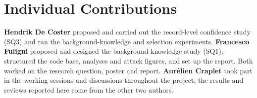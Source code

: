 \section*{Individual Contributions}

\textbf{Hendrik De Coster} proposed and carried out the record-level confidence study (SQ3) and ran the background-knowledge and selection experiments. \textbf{Francesco Fuligni} proposed and designed the background-knowledge study (SQ1), structured the code base, analyses and attack figures, and set up the report. Both worked on the research question, poster and report. \textbf{Aur\'elien Craplet} took part in the working sessions and discussions throughout the project; the results and reviews reported here come from the other two authors.
